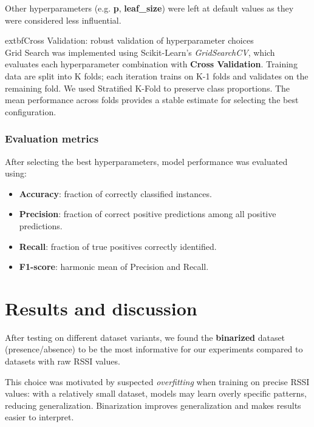 \documentclass{article}
\begin{document}
Other hyperparameters (e.g. \textbf{p}, \textbf{leaf\_size}) were left at default values as they were considered less influential.

    	extbf{Cross Validation: robust validation of hyperparameter choices}\\
Grid Search was implemented using Scikit-Learn's \textit{GridSearchCV}, which evaluates each hyperparameter combination with \textbf{Cross Validation}. Training data are split into K folds; each iteration trains on K-1 folds and validates on the remaining fold. We used Stratified K-Fold to preserve class proportions. The mean performance across folds provides a stable estimate for selecting the best configuration.

\subsubsection{Evaluation metrics}
After selecting the best hyperparameters, model performance was evaluated using:
\begin{itemize}
    \item \textbf{Accuracy}: fraction of correctly classified instances.
    \item \textbf{Precision}: fraction of correct positive predictions among all positive predictions.
    \item \textbf{Recall}: fraction of true positives correctly identified.
    \item \textbf{F1-score}: harmonic mean of Precision and Recall.
\end{itemize}


\section{Results and discussion}
After testing on different dataset variants, we found the \textbf{binarized} dataset (presence/absence) to be the most informative for our experiments compared to datasets with raw RSSI values.

This choice was motivated by suspected \textit{overfitting} when training on precise RSSI values: with a relatively small dataset, models may learn overly specific patterns, reducing generalization. Binarization improves generalization and makes results easier to interpret.
\end{document}
